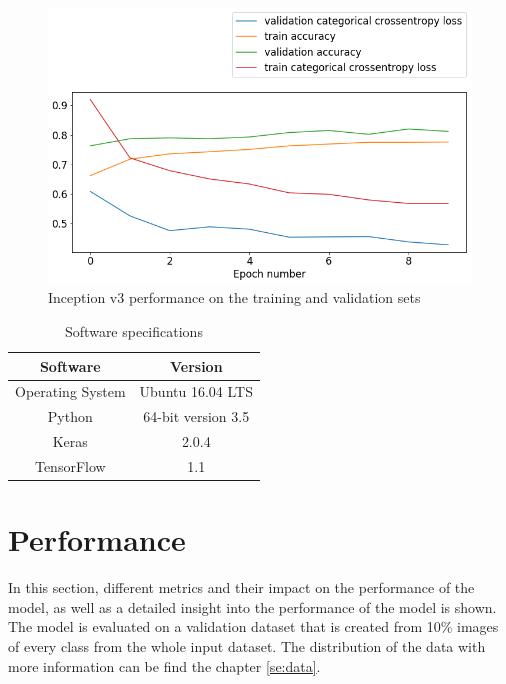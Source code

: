 \documentclass[times, utf8, diplomski]{fer}
\begin{document}
\begin{figure}
  \includegraphics[scale=0.61]{figures/inceptionv3_performance.png}
  \centering
  \caption{Inception v3 performance on the training and validation sets}
  \label{fig:inceptionv3_performance}
\end{figure}


\begin{table}
\centering
\caption{Software specifications}
\label{tb:software_specifications}
\begin{tabular}{cc}
\hline 
Software & Version \\ \hline 
Operating System & Ubuntu 16.04 LTS \\ 
Python & 64-bit version 3.5 \\ 
Keras & 2.0.4 \\
TensorFlow & 1.1 \\
\hline 
\end{tabular} 
\end{table}

\section{Performance}

In this section, different metrics and their impact on the performance of the model, as well as a detailed insight into the performance of the model is shown. The model is evaluated on a validation dataset that is created from 10\% images of every class from the whole input dataset. The distribution of the data with more information can be find the chapter \ref{se:data}.
\end{document}

